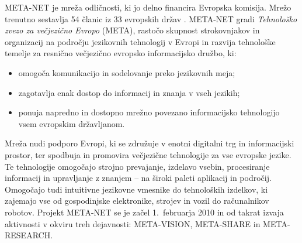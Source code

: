 \begin{multicols}{2}

META-NET je mreža odličnosti, ki jo delno financira Evropska komisija. Mrežo trenutno sestav\-lja 54 članic iz 33 evropskih držav \cite{rehm2011}. META-NET gradi \textit{Tehnološko zvezo za večjezično Evropo} (META), rastočo skupnost strokovnjakov in organizacij na področju jezikovnih tehnologij v Evropi in razvija tehnološke temelje za resnično večjezično evropsko informacij\-sko družbo, ki:

\begin{itemize}
\item omogoča komunikacijo in sodelovanje preko jezikovnih meja;
\item zagotav\-lja enak dostop do informacij in znanja v vseh jezikih;
\item ponuja napredno in dostopno mrežno povezano informacij\-sko tehnologijo vsem evropskim držav\-ljanom.
\end{itemize}

Mreža nudi podporo Evropi, ki se združuje v enotni digitalni trg in informacij\-ski prostor, ter spodbuja in promovira večjezične tehnologije za vse evropske jezike. Te tehnologije omogočajo stroj\-no prevajanje, izdelavo vsebin, procesiranje informacij in uprav\-ljanje z znanjem – na široki paleti aplikacij in področij. Omogočajo tudi intuitivne jezikovne vmesnike do tehnoloških izdelkov, ki zajemajo vse od gospodinjske elektronike, strojev in vozil do računalnikov robotov. Projekt META-NET se je začel 1.~februarja 2010 in od takrat izvaja aktivnosti v okviru treh dejavnosti: META-VISION, META-SHARE in META-RESEARCH.


\end{multicols}
